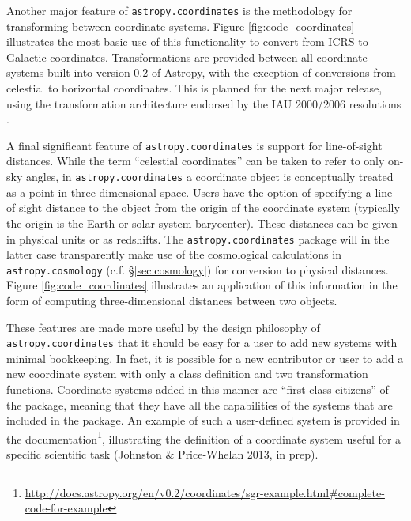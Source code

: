 \documentclass[traditabstract]{aa}
\begin{document}
Another major feature of \texttt{astropy.coordinates} is the methodology for
transforming between coordinate systems. Figure \ref{fig:code_coordinates}
illustrates the most basic use of this functionality to convert from ICRS to
Galactic coordinates. Transformations are provided between all coordinate
systems built into version 0.2 of Astropy, with the exception of conversions
from celestial to horizontal coordinates. This is planned for the next major
release, using the transformation architecture endorsed by the IAU 2000/2006
resolutions \citep[see e.g.,][]{soffel03, usnocircular179}.

A final significant feature of \texttt{astropy.coordinates} is support for
line-of-sight distances. While the term ``celestial coordinates'' can be taken
to refer to only on-sky angles, in \texttt{astropy.coordinates} a coordinate
object is conceptually treated as a point in three dimensional space. Users
have the option of specifying a line of sight distance to the object from the
origin of the coordinate system (typically the origin is the Earth or solar
system barycenter). These distances can be given in physical units or as
redshifts. The \texttt{astropy.coordinates} package will in the latter case
transparently make use of the cosmological calculations in
\texttt{astropy.cosmology} (c.f. \S\ref{sec:cosmology}) for conversion to
physical distances. Figure \ref{fig:code_coordinates} illustrates an
application of this information in the form of computing three-dimensional
distances between two objects.

These features are made more useful by the design philosophy of
\texttt{astropy.coordinates} that it should be easy for a user to add new
systems with minimal bookkeeping. In fact, it is possible for a new
contributor or user to add a new coordinate system with only a class
definition and two transformation functions. Coordinate systems added in this
manner are ``first-class citizens'' of the package, meaning that they have all
the capabilities of the systems that are included in the package. An example
of such a user-defined system is provided in the
documentation\footnote{\url{http://docs.astropy.org/en/v0.2/coordinates/sgr-example.html#complete-code-for-example}},
illustrating the definition of a coordinate system useful for a specific
scientific task (Johnston \& Price-Whelan 2013, in prep).
\end{document}
